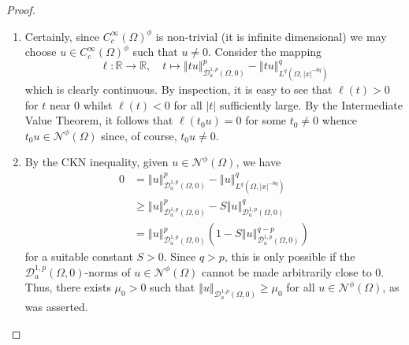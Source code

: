 \documentclass[10pt, reqno]{amsart}
\newcommand{\RR}{\mathbb{R}}
\newcommand{\Om}{\Omega}
\newcommand{\abs}[1]{\left\vert #1 \right\vert}
\newcommand{\norm}[1]{\left\Vert #1 \right\Vert}
\newcommand{\D}{\mathcal{D}}
\newcommand{\N}{\mathcal{N}}
\numberwithin{equation}{section}
\theoremstyle{definition}
\theoremstyle{remark}
\theoremstyle{plain}
\begin{document}
	\begin{proof}
		\leavevmode
		\begin{enumerate}[leftmargin=*]
			\item  Certainly, since $C_c^\infty(\Om)^\phi$ is non-trivial (it is infinite dimensional) we may choose $u \in C_c^\infty(\Om)^\phi$ such that $u \ne 0$. Consider the mapping
			\[
			\ell : \RR \to \RR, \quad t \mapsto \norm{tu}_{\D_a^{1,p}(\Om,0)}^p - \norm{tu}_{L^q(\Om, \abs{x}^{-bq})}^q
			\]
			which is clearly continuous. By inspection, it is easy to see that $\ell(t) > 0$ for $t$ near $0$ whilst $\ell(t) < 0$ for all $\abs{t}$ sufficiently large. By the Intermediate Value Theorem, it follows that $\ell(t_0 u) = 0$ for some $t_0 \ne 0$ whence $t_0 u \in \N^\phi(\Om)$ since, of course, $t_0 u \ne 0$.
			\item By the CKN inequality, given $u \in \N^\phi(\Om)$, we have
			\begin{align*}
				0&= \norm{u}^p_{\D^{1,p}_a(\Om,0)} - \norm{u}^{q}_{L^q(\Om,\abs{x}^{-bq})}\\
				&\ge \norm{u}^p_{\D^{1,p}_a(\Om,0)} - S\norm{u}^{q}_{\D_a^{1,p}(\Om,0)}\\
				&= \norm{u}^p_{\D^{1,p}_a(\Om,0)} \left(1-S\norm{u}^{q-p}_{\D^{1,p}_a(\Om,0)}\right)
			\end{align*}
			for a suitable constant $S >0$. Since $q > p$, this is only possible if the $\D_a^{1,p}(\Om,0)$-norms of $u \in \N^\phi(\Om)$ cannot be made arbitrarily close to $0$. Thus, there exists $\mu_0 > 0$ such that $\norm{u}_{\D_a^{1,p}(\Om,0)} \ge \mu_0$ for all $u \in \N^\phi(\Om)$, as was asserted.
			

\end{enumerate}
\end{proof}
\end{document}
